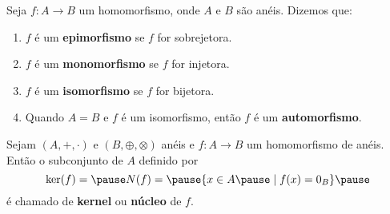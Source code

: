 \documentclass{beamer}
\begin{document}
    \begin{frame}
        \begin{definicao}Seja $f:A\rightarrow B$ um homomorfismo, onde $A$ e $B$ são anéis. Dizemos que:
            \begin{enumerate}[label={\roman*})]
                \item $f$ é um \textbf{epimorfismo} \pause se $f$ for sobrejetora.\pause

                \vspace{.5cm}

                \item $f$ é um \textbf{monomorfismo} \pause se $f$ for injetora.\pause

                \vspace{.5cm}

                \item $f$ é um \textbf{isomorfismo} \pause se $f$ for bijetora.\pause

                \vspace{.5cm}

                \item Quando $A=B$ \pause e $f$ é um isomorfismo, \pause então $f$ é um \textbf{automorfismo}.\pause

                \vspace{.5cm}

            \end{enumerate}
        \end{definicao}
    \end{frame}

    \begin{frame}
        \begin{definicao}
            Sejam $(A, +, \cdot)$ e $(B, \oplus, \otimes)$ anéis \pause e $f : A \to B$ um homomorfismo de anéis. \pause Então o subconjunto de $A$ \pause definido por\pause
            \[
                \ker(f) = \pause N(f) =\pause \{ x \in A \pause \mid f(x) = 0_B\}\pause
            \]
            é chamado de \textbf{kernel} \pause ou \textbf{n\'ucleo} \pause de $f$.\pause
        \end{definicao}
    \end{frame}
\end{document}
